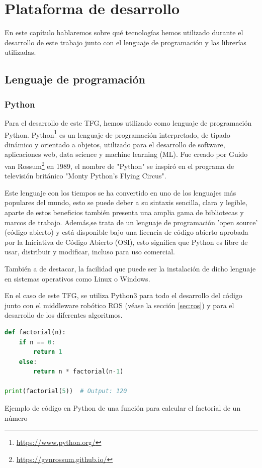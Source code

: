 \chapter{Plataforma de desarrollo}
\label{cap:capitulo3}

En este capítulo hablaremos sobre qué tecnologías hemos utilizado durante el desarrollo de este trabajo junto con el lenguaje de programación y las librerías utilizadas.
\section{Lenguaje de programación}
\label{sec:programación}
\subsection{Python}
\label{sec:python}
Para el desarrollo de este TFG, hemos utilizado como lenguaje de programación Python. Python\footnote{\url{https://www.python.org/}} es un lenguaje de programación interpretado, 
de tipado dinámico y orientado a objetos,
utilizado para el desarrollo de software, aplicaciones web, data science y machine learning (ML).  
Fue creado por Guido van Rossum\footnote{\url{https://gvnrossum.github.io/}} en 1989, el nombre de "Python" se inspiró en el programa de televisión británico 
"Monty Python's Flying Circus". \newline

Este lenguaje con los tiempos se ha convertido en uno de los lenguajes más populares del mundo, esto se puede deber a su sintaxis sencilla, clara y legible, aparte 
de estos beneficios también presenta una amplia gama de bibliotecas y marcos de trabajo. Además,se trata de un lenguaje de programación 'open source' (código abierto) y está disponible bajo
una licencia de código abierto aprobada por la Iniciativa de Código Abierto (OSI), esto significa que Python es libre de usar, distribuir y modificar, incluso para uso
comercial. \newline

También a de destacar, la facilidad que puede ser la instalación de dicho lenguaje en sistemas operativos como Linux o Windows. \newline

En el caso de este TFG, se utiliza Python3 para todo el desarrollo del código junto con el middleware robótico ROS (véase la sección \ref{sec:ros}) y para el desarrollo
de los diferentes algoritmos. 
\newline

\begin{code}[h]
\begin{lstlisting}[language=Python]
  def factorial(n):
    if n == 0:
        return 1
    else:
        return n * factorial(n-1)

print(factorial(5))  # Output: 120

\end{lstlisting}
\caption[Ejemplo de código en Python de una función para calcular el factorial de un número]{Ejemplo de código en Python de una función para calcular el factorial de un número}
\label{cod:codejemplo}
\end{code}  


